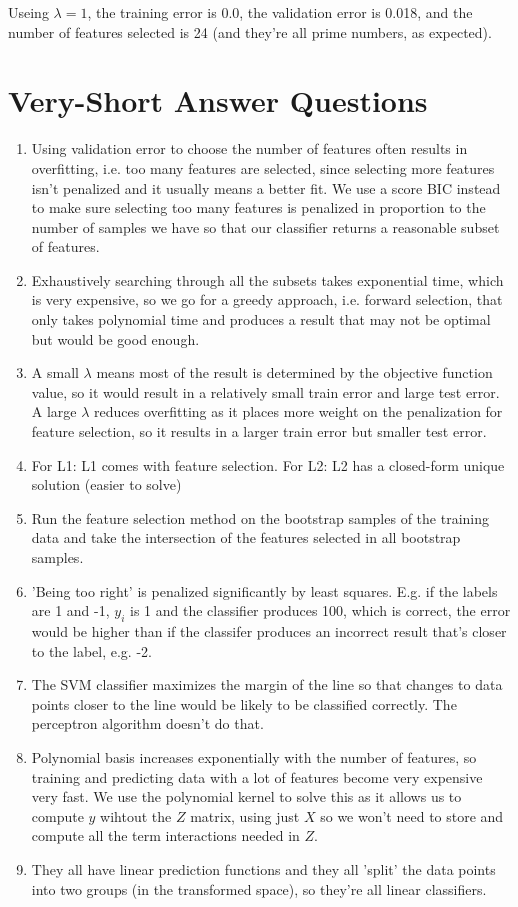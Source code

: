 \documentclass{article}
\def\enum#1{\begin{enumerate}#1\end{enumerate}}
\begin{document}
Useing $\lambda = 1$, the training error is 0.0, the validation error is 0.018, and the number of features selected is 24 (and they're all prime numbers, as expected).

\section{Very-Short Answer Questions}

\enum{
\item Using validation error to choose the number of features often results in overfitting, i.e. too many features are selected, since selecting more features isn't penalized and it usually means a better fit. We use a score BIC instead to make sure selecting too many features is penalized in proportion to the number of samples we have so that our classifier returns a reasonable subset of features.
\item Exhaustively searching through all the subsets takes exponential time, which is very expensive, so we go for a greedy approach, i.e. forward selection, that only takes polynomial time and produces a result that may not be optimal but would be good enough.
\item A small $\lambda$ means most of the result is determined by the objective function value, so it would result in a relatively small train error and large test error. A large $\lambda$ reduces overfitting as it places more weight on the penalization for feature selection, so it results in a larger train error but smaller test error.
\item For L1: L1 comes with feature selection. For L2: L2 has a closed-form unique solution (easier to solve)
\item Run the feature selection method on the bootstrap samples of the training data and take the intersection of the features selected in all bootstrap samples.
\item 'Being too right' is penalized significantly by least squares. E.g. if the labels are 1 and -1, $y_i$ is 1 and the classifier produces 100, which is correct, the error would be higher than if the classifer produces an incorrect result that's closer to the label, e.g. -2.
\item The SVM classifier maximizes the margin of the line so that changes to data points closer to the line would be likely to be classified correctly. The perceptron algorithm doesn't do that.
\item Polynomial basis increases exponentially with the number of features, so training and predicting data with a lot of features become very expensive very fast. We use the polynomial kernel to solve this as it allows us to compute $y$ wihtout the $Z$ matrix, using just $X$ so we won't need to store and compute all the term interactions needed in $Z$.
\item They all have linear prediction functions and they all 'split' the data points into two groups (in the transformed space), so they're all linear classifiers.
}
\end{document}

